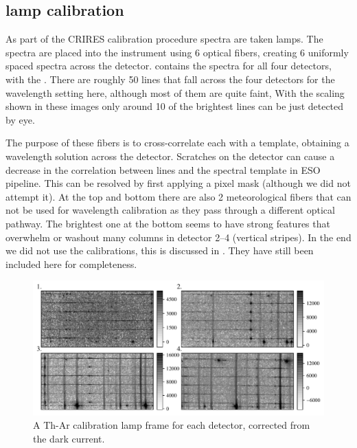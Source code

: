 

\subsection{{\thar} lamp calibration}
\label{subsec:th-ar}
As part of the CRIRES calibration procedure spectra are taken {\thar} lamps. The {\thar} spectra are placed into the instrument using 6 optical fibers, creating 6 uniformly spaced spectra across the detector.
 contains the {\thar} spectra for all four detectors, with the {\thar}. There are roughly 50 {\thar} lines that fall across the four detectors for the wavelength setting here, although most of them are quite faint, With the scaling shown in these images only around 10 of the brightest lines can be just detected by eye. 

The purpose of these fibers is to cross-correlate each with a {\thar} template, obtaining a wavelength solution across the detector. Scratches on the detector can cause a decrease in the correlation between {\thar} lines and the spectral template in ESO pipeline. This can be resolved by first applying a pixel mask (although we did not attempt it). At the top and bottom there are also 2 meteorological fibers that can not be used for wavelength calibration as they pass through a different optical pathway.  The brightest one at the bottom seems to have strong features that overwhelm or washout many columns in detector 2--4 (vertical stripes). 
In the end we did not use the {\thar} calibrations, this is discussed in . They have still been included here for completeness.

\begin{figure}
\includegraphics[width=\hsize]{./figures/reduction/lamp_plots_cbar_each.pdf}
\caption{A Th-Ar calibration lamp frame for each detector, corrected from the dark current.}
    \label{fig:caliblamps}
\end{figure}

